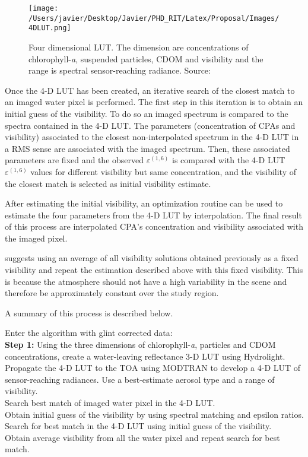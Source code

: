 \begin{figure}[htb]
  \centering
  \texttt{[image: /Users/javier/Desktop/Javier/PHD\_RIT/Latex/Proposal/Images/4DLUT.png]}
  \caption{Four dimensional LUT. The dimension are concentrations of chlorophyll-{\it a}, suspended particles, CDOM and visibility and the range is spectral sensor-reaching radiance. Source: \cite{GeraceThesis}}
  \label{fig:4DLUT} 
\end{figure}
Once the 4-D LUT has been created, an iterative search of the closest match to an imaged water pixel is performed. The first step in this iteration is to obtain an initial guess of the visibility. To do so an imaged spectrum is compared to the spectra contained in the 4-D LUT. The parameters (concentration of CPAs and visibility) associated to the closest non-interpolated spectrum in the 4-D LUT in a RMS sense are associated with the imaged spectrum. Then, these associated parameters are fixed and the observed $\varepsilon^{(1,6)}$ is compared with the 4-D LUT $\varepsilon^{(1,6)}$ values for different visibility but same concentration, and the visibility of the closest match is selected as initial visibility estimate.

After estimating the initial visibility, an optimization routine can be used to estimate the four parameters from the 4-D LUT by interpolation. The final result of this process are interpolated CPA's concentration and visibility associated with the imaged pixel.

\cite{GeraceThesis} suggests using an average of all visibility solutions obtained previously as a fixed visibility and repeat the estimation described above with this fixed visibility. This is because the atmosphere should not have a high variability in the scene and therefore be approximately constant over the study region.

A summary of this process is described below.

Enter the algorithm with glint corrected data:\\
{\bf Step 1:} Using the three dimensions of chlorophyll-{\it a}, particles and CDOM concentrations, create a water-leaving reflectance 3-D LUT using Hydrolight.\\
 Propagate the 4-D LUT to the TOA using MODTRAN to develop a 4-D LUT of sensor-reaching radiances. Use a best-estimate aerosol type and a range of visibility.\\
 Search best match of imaged water pixel in the 4-D LUT.\\
 Obtain initial guess of the visibility by using spectral matching and epsilon ratios.\\
 Search for best match in the 4-D LUT using initial guess of the visibility.\\
 Obtain average visibility from all the water pixel and repeat search for best match.\\

